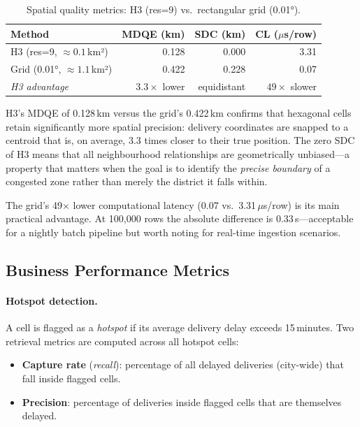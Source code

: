 \begin{table}[h]
\centering
\caption{Spatial quality metrics: H3 (res=9) vs.\ rectangular grid (0.01°).}
\label{tab:spatial_metrics}
\begin{tabular}{lrrr}
\toprule
\textbf{Method} & \textbf{MDQE (km)} & \textbf{SDC (km)} & \textbf{CL ($\mu$s/row)} \\
\midrule
H3 (res=9, ${\approx}0.1$\,km²)    & 0.128 & 0.000 & 3.31 \\
Grid (0.01°, ${\approx}1.1$\,km²)  & 0.422 & 0.228 & 0.07 \\
\midrule
\textit{H3 advantage}               & $3.3\times$ lower & equidistant & $49\times$ slower \\
\bottomrule
\end{tabular}
\end{table}

H3's MDQE of 0.128\,km versus the grid's 0.422\,km confirms that hexagonal
cells retain significantly more spatial precision: delivery coordinates are
snapped to a centroid that is, on average, 3.3 times closer to their true
position.
The zero SDC of H3 means that all neighbourhood relationships are
geometrically unbiased—a property that matters when the goal is to
identify the \emph{precise boundary} of a congested zone rather than
merely the district it falls within.

The grid's 49$\times$ lower computational latency (0.07 vs.\ 3.31\,$\mu$s/row)
is its main practical advantage.
At 100{,}000 rows the absolute difference is 0.33\,s—acceptable for a
nightly batch pipeline but worth noting for real-time ingestion scenarios.


\subsection{Business Performance Metrics}

\paragraph{Hotspot detection.}
A cell is flagged as a \emph{hotspot} if its average delivery delay exceeds
15\,minutes.
Two retrieval metrics are computed across all hotspot cells:

\begin{itemize}
  \item \textbf{Capture rate} (\emph{recall}): percentage of all delayed
        deliveries (city-wide) that fall inside flagged cells.
  \item \textbf{Precision}: percentage of deliveries inside flagged cells
        that are themselves delayed.
\end{itemize}


